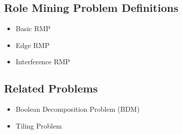     \subsection{Role Mining Problem Definitions}
    \begin{itemize}
        \item Basic RMP
        \item Edge RMP
        \item Interference RMP
    \end{itemize}
        
    \subsection{Related Problems}
    \begin{itemize}
        \item Boolean Decomposition Problem (BDM)
        \item Tiling Problem
    \end{itemize}